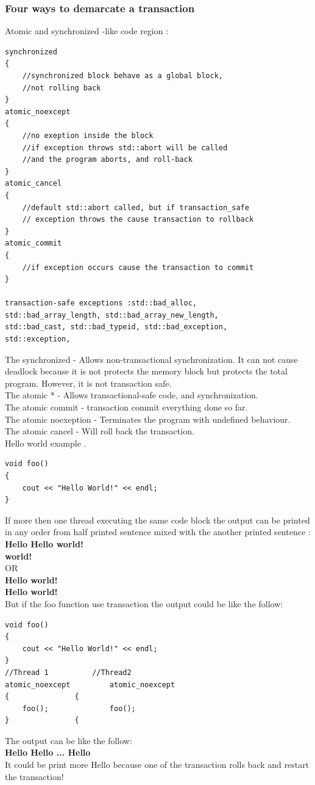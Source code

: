 \documentclass[12pt]{article}
\begin{document}
{\setlength{\parindent}{0cm}
\subsubsection{Four ways to demarcate a transaction}
Atomic and synchronized -like code region :\cite{Torvald}}
\hfill
\begin{lstlisting}
synchronized
{
	//synchronized block behave as a global block,
	//not rolling back
}
atomic_noexcept
{
	//no exeption inside the block
	//if exception throws std::abort will be called
	//and the program aborts, and roll-back
}
atomic_cancel
{  
	//default std::abort called, but if transaction_safe
	// exception throws the cause transaction to rollback
}
atomic_commit
{
	//if exception occurs cause the transaction to commit
}

transaction-safe exceptions :std::bad_alloc,
std::bad_array_length, std::bad_array_new_length,
std::bad_cast, std::bad_typeid, std::bad_exception,
std::exception,
\end{lstlisting}
{\setlength{\parindent}{0cm}
The synchronized - Allows non-transactional synchronization. It can not cause deadlock because it is not protects the memory block but protects the total program. However, it is not transaction safe.\\
The atomic * - Allows transactional-safe code, and synchronization.\\
The atomic commit - transaction commit everything done so far.\\
The atomic noexeption - Terminates the program with undefined behaviour.\\
The atomic cancel - Will roll back the transaction.
\cite{Torvald}\\

Hello world example .
}
\begin{lstlisting}
void foo()
{
	cout << "Hello World!" << endl;
}
\end{lstlisting}
{\setlength{\parindent}{0cm}
If more then one thread executing the same code block the output can be printed in any order from half printed sentence mixed with the another printed sentence :
\textbf{Hello Hello world!\\
world!}\\

OR\\

\textbf{Hello world!\\
Hello world!}\\

But if the foo function use transaction the output could be like the follow:
}
\begin{lstlisting}
void foo()
{
	cout << "Hello World!" << endl;
}
//Thread 1			//Thread2
atomic_noexcept			atomic_noexcept	
{				{
	foo();				foo();
}				{
\end{lstlisting}
{\setlength{\parindent}{0cm}
The output can be like the follow:\\
\textbf{Hello Hello ... Hello}\\
It could be print more Hello because one of the transaction rolls back and restart the transaction!\\
}
\end{document}
